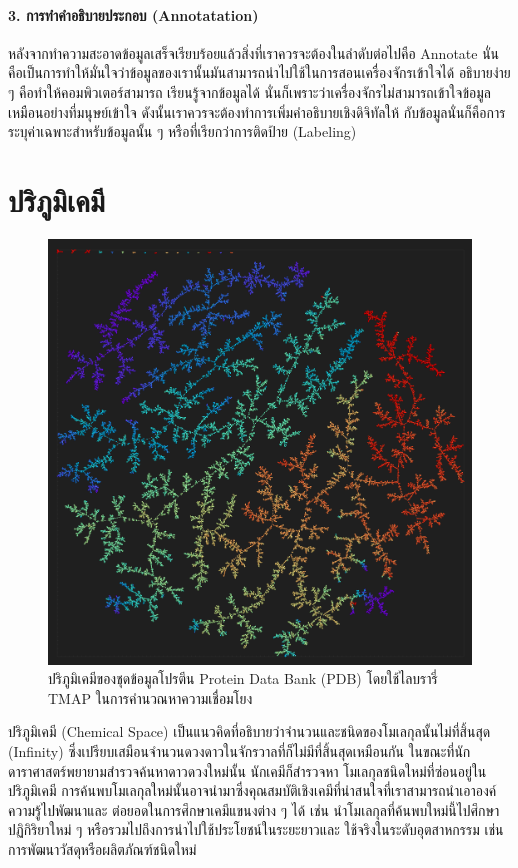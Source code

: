 \paragraph{3. การทำคำอธิบายประกอบ (Annotatation)} หลังจากทำความสะอาดข้อมูลเสร็จเรียบร้อยแล้วสิ่งที่เราควรจะต้องในลำดับต่อไปคือ 
Annotate นั่นคือเป็นการทำให้มั่นใจว่าข้อมูลของเรานั้นมันสามารถนำไปใช้ในการสอนเครื่องจักรเข้าใจได้ อธิบายง่าย ๆ คือทำให้คอมพิวเตอร์สามารถ%
เรียนรู้จากข้อมูลได้ นั่นก็เพราะว่าเครื่องจักรไม่สามารถเข้าใจข้อมูลเหมือนอย่างที่มนุษย์เข้าใจ ดังนั้นเราควรจะต้องทำการเพิ่มคำอธิบายเชิงดิจิทัลให้%
กับข้อมูลนั่นก็คือการระบุค่าเฉพาะสำหรับข้อมูลนั้น ๆ หรือที่เรียกว่าการติดป้าย (Labeling)

\section{ปริภูมิเคมี}
\label{sec:chem_space}

\begin{figure}[htbp]
    \centering
    \includegraphics[width=0.9\linewidth]{fig/tmap_pdb.png}
    \caption{ปริภูมิเคมีของชุดข้อมูลโปรตีน Protein Data Bank (PDB) โดยใช้ไลบรารี่ TMAP ในการคำนวณหาความเชื่อมโยง}
    \label{fig:tmap_pdb}
\end{figure}

ปริภูมิเคมี (Chemical Space)\autocite{kirkpatrick2004} เป็นแนวคิดที่อธิบายว่าจำนวนและชนิดของโมเลกุลนั้นไม่ที่สิ้นสุด (Infinity) 
ซึ่งเปรียบเสมือนจำนวนดวงดาวในจักรวาลที่ก็ไม่มีที่สิ้นสุดเหมือนกัน ในขณะที่นักดาราศาสตร์พยายามสำรวจค้นหาดาวดวงใหม่นั้น นักเคมีก็สำรวจหา%
โมเลกุลชนิดใหม่ที่ซ่อนอยู่ในปริภูมิเคมี การค้นพบโมเลกุลใหม่นั้นอาจนำมาซึ่งคุณสมบัติเชิงเคมีที่น่าสนใจที่เราสามารถนำเอาองค์ความรู้ไปพัฒนาและ%
ต่อยอดในการศึกษาเคมีแขนงต่าง ๆ ได้ เช่น นำโมเลกุลที่ค้นพบใหม่นี้ไปศึกษาปฏิกิริยาใหม่ ๆ หรือรวมไปถึงการนำไปใช้ประโยชน์ในระยะยาวและ%
ใช้จริงในระดับอุตสาหกรรม เช่น การพัฒนาวัสดุหรือผลิตภัณฑ์ชนิดใหม่ 

